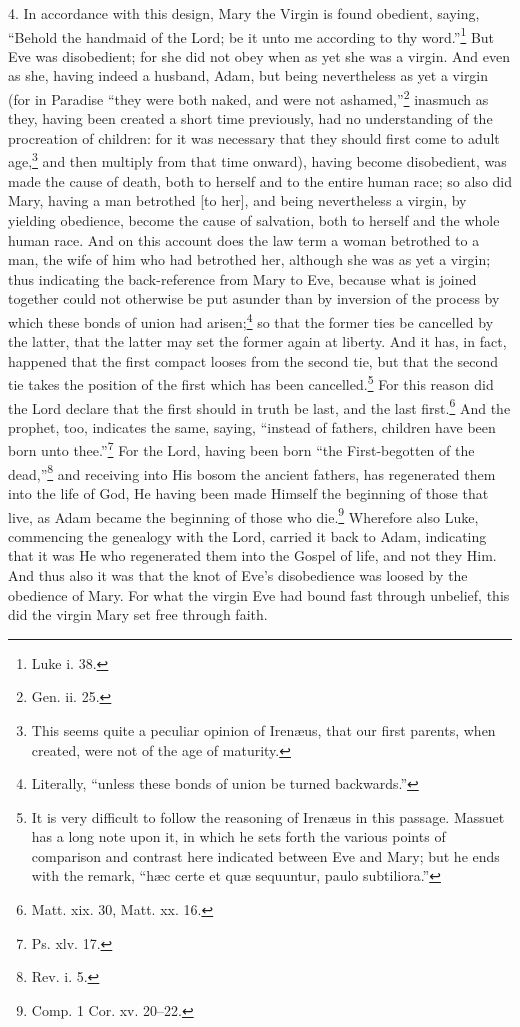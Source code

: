 4. In accordance with this design, Mary the Virgin is found obedient, saying, “Behold the handmaid of the Lord; be it unto me according to thy word.”\footnote{Luke i. 38.} But Eve was disobedient; for she did not obey when as yet she was a virgin. And even as she, having indeed a husband, Adam, but being nevertheless as yet a virgin (for in Paradise “they were both naked, and were not ashamed,”\footnote{Gen. ii. 25.} inasmuch as they, having been created a short time previously, had no understanding of the procreation of children: for it was necessary that they should first come to adult age,\footnote{This seems quite a peculiar opinion of Irenæus, that our first parents, when created, were not of the age of maturity.} and then multiply from that time onward), having become disobedient, was made the cause of death, both to herself and to the entire human race; so also did Mary, having a man betrothed [to her], and being nevertheless a virgin, by yielding obedience, become the cause of salvation, both to herself and the whole human race. And on this account does the law term a woman betrothed to a man, the wife of him who had betrothed her, although she was as yet a virgin; thus indicating the back-reference from Mary to Eve, because what is joined together could not otherwise be put asunder than by inversion of the process by which these bonds of union had arisen;\footnote{Literally, “unless these bonds of union be turned backwards.”} so that the former ties be cancelled by the latter, that the latter may set the former again at liberty. And it has, in fact, happened that the first compact looses from the second tie, but that the second tie takes the position of the first which has been cancelled.\footnote{It is very difficult to follow the reasoning of Irenæus in this passage. Massuet has a long note upon it, in which he sets forth the various points of comparison and contrast here indicated between Eve and Mary; but he ends with the remark, “hæc certe et quæ sequuntur, paulo subtiliora.”} For this reason did the Lord declare that the first should in truth be last, and the last first.\footnote{Matt. xix. 30, Matt. xx. 16.} And the prophet, too, indicates the same, saying, “instead of fathers, children have been born unto thee.”\footnote{Ps. xlv. 17.} For the Lord, having been born “the First-begotten of the dead,”\footnote{Rev. i. 5.} and receiving into His bosom the ancient fathers, has regenerated them into the life of God, He having been made Himself the beginning of those that live, as Adam became the beginning of those who die.\footnote{Comp. 1 Cor. xv. 20–22.} Wherefore also Luke, commencing the genealogy with the Lord, carried it back to Adam, indicating that it was He who regenerated them into the Gospel of life, and not they Him. And thus also it was that the knot of Eve’s disobedience was loosed by the obedience of Mary. For what the virgin Eve had bound fast through unbelief, this did the virgin Mary set free through faith.

